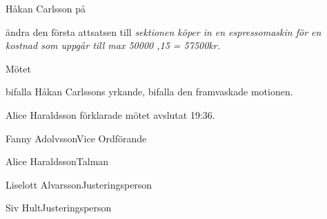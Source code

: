 \documentclass{dsekminutes}
\begin{document}
\begin{parasection}
  Håkan Carlsson  på
  \begin{attlist}
    \att ändra den första attsatsen till \emph{sektionen köper in en
    espresso\-maskin för en kostnad som uppgår till max 50000 ,15 =
    57500kr.}
  \end{attlist}

  Mötet 
  \begin{attlist}
    \att bifalla Håkan Carlssons yrkande,
    \att bifalla den framvaskade motionen.
  \end{attlist}

  Alice Haraldsson förklarade mötet avslutat 19:36.

\end{parasection}

\vspace{5cm}

\signature{Vid protokollet}{Fanny Adolvsson}{Vice Ordförande}
\signature{Mötesordförande}{Alice Haraldsson}{Talman}
\signature{Justeras}{Liselott Alvarsson}{Justeringsperson}
\signature{Justeras}{Siv Hult}{Justeringsperson}
\end{document}
